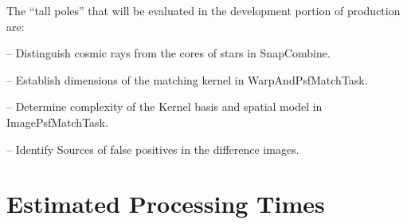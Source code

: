 \documentclass[12pt]{article}
\begin{document}
The ``tall poles'' that will be evaluated in the development portion of production are:

-- Distinguish cosmic rays from the cores of stars in SnapCombine.

-- Establish dimensions of the matching kernel in WarpAndPsfMatchTask.

-- Determine complexity of the Kernel basis and spatial model in ImagePsfMatchTask.

-- Identify Sources of false positives in the difference images.



\clearpage 
\section{Estimated Processing Times} 
\end{document}
